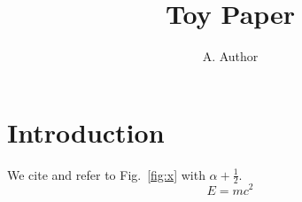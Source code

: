 \documentclass{article}
\title{Toy Paper}
\author{A. Author}
\begin{document}
\maketitle
\section{Introduction}\label{sec:intro}
We cite \cite{milgrom83} and refer to Fig.~\ref{fig:x} with $\alpha + \frac{1}{2}$.
\begin{equation}E = m c^2 \label{eq:e}\end{equation}
\end{document}
